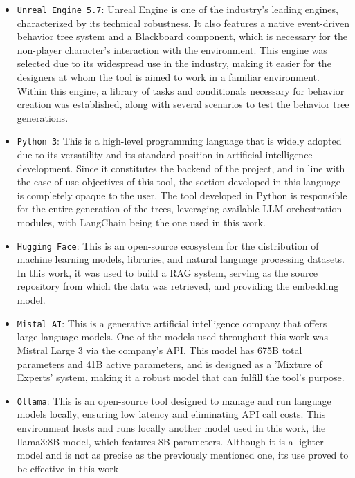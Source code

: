 \begin{itemize}
	\item \texttt{Unreal Engine 5.7}: Unreal Engine is one of the industry's leading engines, characterized by its technical robustness.
	It also features a native event-driven behavior tree system and a Blackboard component, which is necessary for the non-player character's interaction with the environment.
	This engine was selected due to its widespread use in the industry, making it easier for the designers at whom the tool is aimed to work in a familiar environment.
	Within this engine, a library of tasks and conditionals necessary for behavior creation was established, along with several scenarios to test the behavior tree generations.
	\item \texttt{Python 3}: This is a high-level programming language that is widely adopted due to its versatility and its standard position in artificial intelligence development.
	Since it constitutes the backend of the project, and in line with the ease-of-use objectives of this tool, the section developed in this language is completely opaque to the user.
	The tool developed in Python is responsible for the entire generation of the trees, leveraging available LLM orchestration modules, with LangChain being the one used in this work.
	\item \texttt{Hugging Face}: This is an open-source ecosystem for the distribution of machine learning models, libraries, and natural language processing datasets.
	In this work, it was used to build a RAG system, serving as the source repository from which the data was retrieved, and providing the embedding model.
	\item \texttt{Mistal AI}: This is a generative artificial intelligence company that offers large language models.
	One of the models used throughout this work was Mistral Large 3 via the company's API.
	This model has 675B total parameters and 41B active parameters, and is designed as a 'Mixture of Experts' system, making it a robust model that can fulfill the tool's purpose.
	\item \texttt{Ollama}: This is an open-source tool designed to manage and run language models locally, ensuring low latency and eliminating API call costs.
	This environment hosts and runs locally another model used in this work, the llama3:8B model, which features 8B parameters.
	Although it is a lighter model and is not as precise as the previously mentioned one, its use proved to be effective in this work
\end{itemize}

